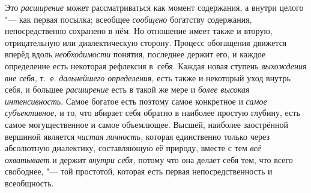Это {\em расширение} может рассматриваться как момент содержания, а внутри
целого "--- как первая посылка; всеобщее {\em сообщено} богатству
содержания, непосредственно сохранено в нём. Но отношение имеет также и
вторую, отрицательную или диалектическую сторону. Процесс обогащения
движется вперёд вдоль {\em необходимости}
понятия, последнее держит его, и каждое определение есть
некоторая рефлексия в~себя. Каждая новая ступень
{\em выхождения вне себя,} т.~е. {\em дальнейшего
определения,} есть также и некоторый уход внутрь себя, и
большее {\em расширение} есть в такой же мере и
{\em более высокая интенсивность}.
Самое богатое есть поэтому самое конкретное и {\em самое субъективное,}
и то, что вбирает себя обратно в наиболее простую глубину,
есть самое могущественное и самое объемлющее. Высшей, наиболее заострённой
вершиной является {\em чистая
личность,} которая единственно только через абсолютную
диалектику, составляющую её природу, вместе с тем
{\em всё охватывает} и держит {\em внутри себя,}
потому что она делает себя тем, что всего свободнее, "---
той простотой, которая есть первая непосредственность и всеобщность.

